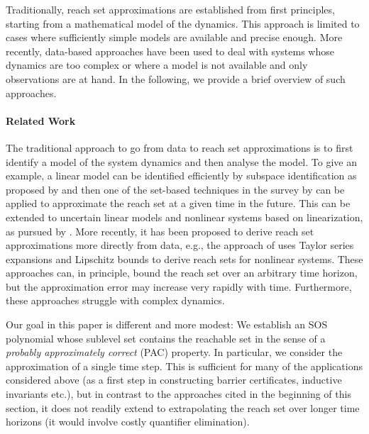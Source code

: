 \documentclass[pmlr]{jmlr}%
\begin{document}
Traditionally, reach set approximations are established from first principles, starting from a mathematical model of the dynamics. This approach is limited to cases where sufficiently simple models are available and precise enough. More recently, data-based approaches have been used to deal with systems whose dynamics are too complex or where a model is not available and only observations are at hand.
In the following, we provide a brief overview of such approaches.

\paragraph{Related Work}
%
The traditional approach to go from data to reach set approximations is to first identify a model of the system dynamics and then analyse the model. To give an example, a linear model can be identified efficiently by subspace identification as proposed by \cite{van2012subspace} and then one of the set-based techniques in the survey by \cite{althoff2021set} can be applied to approximate the reach set at a given time in the future.
This can be extended to uncertain linear models and nonlinear systems based on linearization, as pursued by \cite{Alanwar_2023}.
%
More recently, it has been proposed to derive reach set approximations more directly from data, e.g., the approach of \cite{10.1145/3447928.3457355} uses Taylor series expansions and Lipschitz bounds to derive reach sets for nonlinear systems.
These approaches can, in principle, bound the reach set over an arbitrary time horizon, but the approximation error may increase very rapidly with time. Furthermore, these approaches struggle with complex dynamics.

Our goal in this paper is different and more modest: We establish an SOS polynomial whose sublevel set contains the reachable set in the sense of a \emph{probably approximately correct} (PAC) property. In particular, we consider the approximation of a single time step. This is sufficient for many of the applications considered above (as a first step in constructing barrier certificates, inductive invariants etc.), but in contrast to the approaches cited in the beginning of this section, it does not readily extend to extrapolating the reach set over longer time horizons (it would involve costly quantifier elimination).
%
\end{document}
